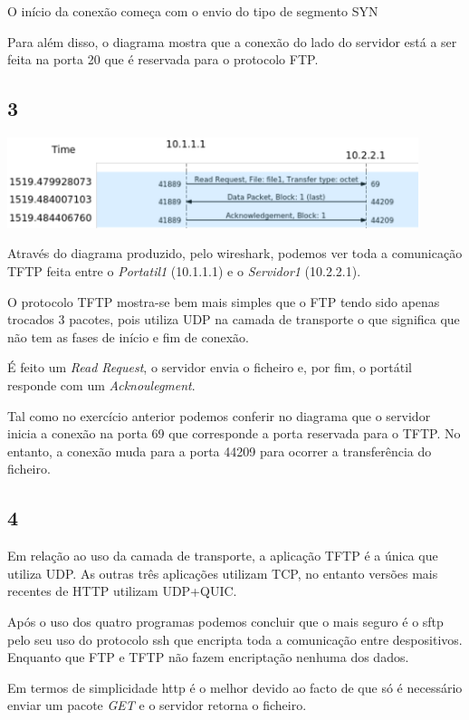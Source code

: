\documentclass{article}
\begin{document}
		O início da conexão começa com o envio do tipo de segmento SYN
                
                Para além disso, o diagrama mostra que a conexão do lado do servidor está a ser feita na porta 20 que é reservada para o protocolo FTP.
        \subsection*{3}
            {
                \centering
                \includegraphics[width=12cm]{images/tftp-wireshark-flow-graph.png}
                \par
            }
		Através do diagrama produzido, pelo wireshark, podemos ver toda a comunicação TFTP feita entre o \textit{Portatil1} (10.1.1.1) e o \textit{Servidor1} (10.2.2.1).

                O protocolo TFTP mostra-se bem mais simples que o FTP tendo sido apenas trocados 3 pacotes, pois utiliza UDP na camada de transporte o que significa que não tem as fases de início e fim de conexão.

            É feito um \textit{Read Request}, o servidor envia o ficheiro e, por fim, o portátil responde com um \textit{Acknoulegment}.

                Tal como no exercício anterior podemos conferir no diagrama que o servidor inicia a conexão na porta 69 que corresponde a porta reservada para o TFTP. No entanto, a conexão muda para a porta 44209 para ocorrer a transferência do ficheiro.
        \subsection*{4}
		Em relação ao uso da camada de transporte, a aplicação TFTP é a única que utiliza UDP. As outras três aplicações utilizam TCP, no entanto versões mais recentes de HTTP utilizam UDP+QUIC.


                Após o uso dos quatro programas podemos concluir que o mais seguro é o sftp pelo seu uso do protocolo ssh que encripta toda a comunicação entre despositivos. Enquanto que FTP e TFTP não fazem encriptação nenhuma dos dados.

                Em termos de simplicidade http é o melhor devido ao facto de que só é necessário enviar um pacote \textit{GET} e o servidor retorna o ficheiro.
\end{document}
